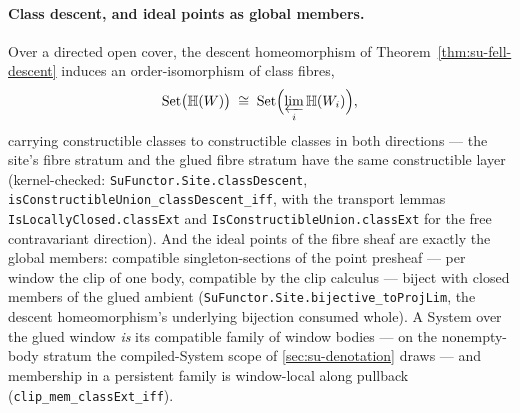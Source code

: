 \paragraph{Class descent, and ideal points as global members.} Over
a directed open cover, the descent homeomorphism of
Theorem~\ref{thm:su-fell-descent} induces an order-isomorphism of
class fibres,
\[
  \mathrm{Set}\bigl(\mathbb{H}(W)\bigr) \;\cong\;
  \mathrm{Set}\Bigl(\varprojlim_i \mathbb{H}(W_i)\Bigr),
\]
carrying constructible classes to constructible classes in both
directions --- the site's fibre stratum and the glued fibre stratum
have the same constructible layer (kernel-checked:
\texttt{SuFunctor.Site.classDescent},
\texttt{isConstructibleUnion\_classDescent\_iff}, with the
transport lemmas \texttt{IsLocallyClosed.classExt} and
\texttt{IsConstructibleUnion.classExt} for the free contravariant
direction). And the ideal points of the fibre sheaf are exactly the
global members: compatible singleton-sections of the point presheaf
--- per window the clip of one body, compatible by the clip
calculus --- biject with closed members of the glued ambient
(\texttt{SuFunctor.Site.bijective\_toProjLim}, the descent
homeomorphism's underlying bijection consumed whole). A System over
the glued window \emph{is} its compatible family of window bodies ---
on the nonempty-body stratum the compiled-System scope of
\autoref{sec:su-denotation} draws --- and membership in a
persistent family is window-local along pullback
(\texttt{clip\_mem\_classExt\_iff}).

